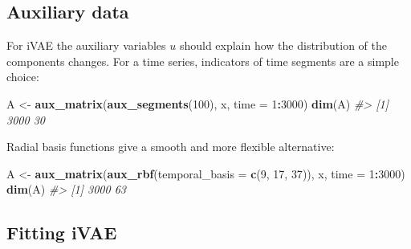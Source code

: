 \documentclass[
]{article}
\newenvironment{Shaded}{\begin{snugshade}}{\end{snugshade}}
\newcommand{\AttributeTok}[1]{\textcolor[rgb]{0.13,0.29,0.53}{#1}}
\newcommand{\CommentTok}[1]{\textcolor[rgb]{0.56,0.35,0.01}{\textit{#1}}}
\newcommand{\DecValTok}[1]{\textcolor[rgb]{0.00,0.00,0.81}{#1}}
\newcommand{\FunctionTok}[1]{\textcolor[rgb]{0.13,0.29,0.53}{\textbf{#1}}}
\newcommand{\NormalTok}[1]{#1}
\newcommand{\OtherTok}[1]{\textcolor[rgb]{0.56,0.35,0.01}{#1}}
\newcommand{\SpecialCharTok}[1]{\textcolor[rgb]{0.81,0.36,0.00}{\textbf{#1}}}
\begin{document}
\subsection{Auxiliary data}\label{auxiliary-data}

For iVAE the auxiliary variables \(u\) should explain how the
distribution of the components changes. For a time series, indicators of
time segments are a simple choice:

\begin{Shaded}
\begin{Highlighting}[]
\NormalTok{A }\OtherTok{\textless{}{-}} \FunctionTok{aux\_matrix}\NormalTok{(}\FunctionTok{aux\_segments}\NormalTok{(}\DecValTok{100}\NormalTok{), x, }\AttributeTok{time =} \DecValTok{1}\SpecialCharTok{:}\DecValTok{3000}\NormalTok{)}
\FunctionTok{dim}\NormalTok{(A)}
\CommentTok{\#\textgreater{} [1] 3000   30}
\end{Highlighting}
\end{Shaded}

Radial basis functions give a smooth and more flexible alternative:

\begin{Shaded}
\begin{Highlighting}[]
\NormalTok{A }\OtherTok{\textless{}{-}} \FunctionTok{aux\_matrix}\NormalTok{(}\FunctionTok{aux\_rbf}\NormalTok{(}\AttributeTok{temporal\_basis =} \FunctionTok{c}\NormalTok{(}\DecValTok{9}\NormalTok{, }\DecValTok{17}\NormalTok{, }\DecValTok{37}\NormalTok{)), x, }\AttributeTok{time =} \DecValTok{1}\SpecialCharTok{:}\DecValTok{3000}\NormalTok{)}
\FunctionTok{dim}\NormalTok{(A)}
\CommentTok{\#\textgreater{} [1] 3000   63}
\end{Highlighting}
\end{Shaded}

\subsection{Fitting iVAE}\label{fitting-ivae}
\end{document}
